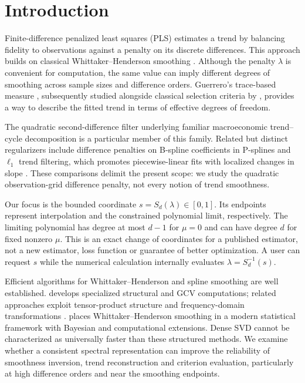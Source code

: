 \section{Introduction}\label{sec:introduction}
Finite-difference penalized least squares (PLS) estimates a trend by balancing fidelity to observations against a penalty on its discrete differences. This approach builds on classical Whittaker--Henderson smoothing \citep{whittaker1923,guerrero2007}. Although the penalty $\lambda$ is convenient for computation, the same value can imply different degrees of smoothing across sample sizes and difference orders. Guerrero's trace-based measure \citep{guerrero2008}, subsequently studied alongside classical selection criteria by \citet{cortes2017}, provides a way to describe the fitted trend in terms of effective degrees of freedom.

The quadratic second-difference filter underlying familiar macroeconomic trend--cycle decomposition \citep{hodrickprescott1997} is a particular member of this family. Related but distinct regularizers include difference penalties on B-spline coefficients in P-splines \citep{eilersmarx1996} and $\ell_1$ trend filtering, which promotes piecewise-linear fits with localized changes in slope \citep{kim2009}. These comparisons delimit the present scope: we study the quadratic observation-grid difference penalty, not every notion of trend smoothness.

Our focus is the bounded coordinate $s=S_d(\lambda)\in[0,1]$. Its endpoints represent interpolation and the constrained polynomial limit, respectively. The limiting polynomial has degree at most $d-1$ for $\mu=0$ and can have degree $d$ for fixed nonzero $\mu$. This is an exact change of coordinates for a published estimator, not a new estimator, loss function or guarantee of better optimization. A user can request $s$ while the numerical calculation internally evaluates $\lambda=S_d^{-1}(s)$.

Efficient algorithms for Whittaker--Henderson and spline smoothing are well established. \citet{weinert2007} develops specialized structural and GCV computations; related approaches exploit tensor-product structure and frequency-domain transformations \citep{eilers2006,garcia2010}. \citet{biessy2026} places Whittaker--Henderson smoothing in a modern statistical framework with Bayesian and computational extensions. Dense SVD cannot be characterized as universally faster than these structured methods. We examine whether a consistent spectral representation can improve the reliability of smoothness inversion, trend reconstruction and criterion evaluation, particularly at high difference orders and near the smoothing endpoints.

